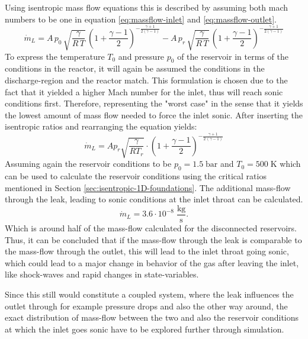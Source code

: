 	Using isentropic mass flow equations this is described by assuming both mach numbers to be one in equation \eqref{eq:massflow-inlet} and \eqref{eq:massflow-outlet}.
	$$
		\dot{m}_L =
		A\, p_0\, \sqrt{\frac{\gamma}{R\,T}}\, \left(1+\frac{\gamma-1}{2}\right)^{-\frac{\gamma+1}{2(\gamma-1)}}
		- A\, p_r\, \sqrt{\frac{\gamma}{R\,T}}\,\left(1+\frac{\gamma-1}{2}\right)^{-\frac{\gamma+1}{2(\gamma-1)}}
	$$
	To express the temperature $T_0$ and pressure $p_0$ of the reservoir in terms of the conditions in the reactor, it will again be assumed the conditions in the discharge-region and the reactor match.
	This formulation is chosen due to the fact that it yielded a higher Mach number for the inlet, thus will reach sonic conditions first.
	Therefore, representing the "worst case" in the sense that it yields the lowest amount of mass flow needed to force the inlet sonic.
	After inserting the isentropic ratios and rearranging the equation yields:
	\begin{equation}
		\dot{m}_L =
		A p_r\sqrt{\frac{\gamma}{R T_r}}\cdot
			\left(
				1 + \frac{\gamma - 1}{2}
			\right)
				^{-\frac{\gamma + 1}{2\,(\gamma - 1)}}
	\end{equation}
	Assuming again the reservoir conditions to be $p_0 = 1.5\;\text{bar}$ and $T_0 = 500\;\text{K}$ which can be used to calculate the reservoir conditions using the critical ratios mentioned in Section \ref{sec:isentropic-1D-foundations}.
	The additional mass-flow through the leak, leading to sonic conditions at the inlet throat can be calculated.
	$$
		\dot{m}_L = 3.6 \cdot 10^{-8} \; \frac{\text{kg}}{\text{s}}.
	$$
	Which is around half of the mass-flow calculated for the disconnected reservoirs.
	Thus, it can be concluded that if the mass-flow through the leak is comparable to the mass-flow through the outlet, this will lead to the inlet throat going sonic, which could lead to a major change in behavior of the gas after leaving the inlet, like shock-waves and rapid changes in state-variables.

	Since this still would constitute a coupled system, where the leak influences the outlet through for example pressure drops and also the other way around, the exact distribution of mass-flow between the two and also the reservoir conditions at which the inlet goes sonic have to be explored further through simulation.
